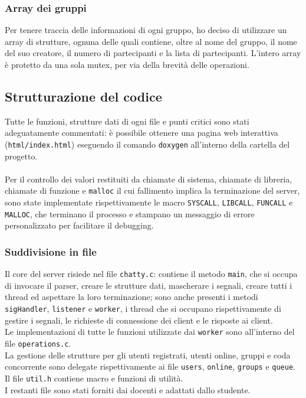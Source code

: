 \documentclass{article}
\begin{document}
\subsubsection{Array dei gruppi}
Per tenere traccia delle informazioni di ogni gruppo, ho deciso di utilizzare un array di strutture, ognuna delle quali contiene, oltre al nome del gruppo, il nome del suo creatore, il numero di partecipanti e la lista di partecipanti. L'intero array è protetto da una sola mutex, per via della brevità delle operazioni.


\subsection{Strutturazione del codice}
Tutte le funzioni, strutture dati di ogni file e punti critici sono stati adeguatamente commentati: è possibile ottenere una pagina web interattiva (\texttt{html/index.html}) eseguendo il comando \texttt{doxygen} all'interno della cartella del progetto.\\\\
Per il controllo dei valori restituiti da chiamate di sistema, chiamate di libreria, chiamate di funzione e \texttt{malloc} il cui fallimento implica la terminazione del server, sono state implementate rispettivamente le macro \texttt{SYSCALL}, \texttt{LIBCALL}, \texttt{FUNCALL} e \texttt{MALLOC}, che terminano il processo e stampano un messaggio di errore personalizzato per facilitare il debugging.

\subsubsection{Suddivisione in file}
Il core del server risiede nel file \texttt{chatty.c}: contiene il metodo \texttt{main}, che si occupa di invocare il parser, creare le strutture dati, mascherare i segnali, creare tutti i thread ed aspettare la loro terminazione; sono anche presenti i metodi \texttt{sigHandler}, \texttt{listener} e \texttt{worker}, i thread che si occupano rispettivamente di gestire i segnali, le richieste di connessione dei client e le risposte ai client.\\
Le implementazioni di tutte le funzioni utilizzate dai \texttt{worker} sono all'interno del file \texttt{operations.c}.\\
La gestione delle strutture per gli utenti registrati, utenti online, gruppi e coda concorrente sono delegate rispettivamente ai file \texttt{users}, \texttt{online}, \texttt{groups} e \texttt{queue}.\\
Il file \texttt{util.h} contiene macro e funzioni di utilità.\\
I restanti file sono stati forniti dai docenti e adattati dallo studente.
\end{document}
